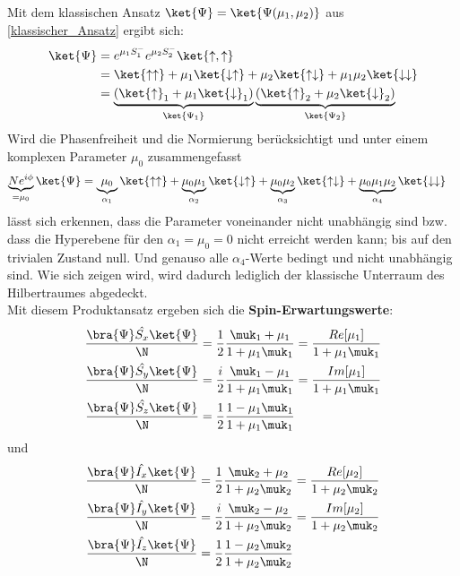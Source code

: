 \noindent Mit dem klassischen Ansatz $\ket{\Psi} = \ket{\Psi(\mu_1, \mu_2)}$ aus \autoref{klassischer_Ansatz} ergibt sich: 
\begin{align}
    \ket{\Psi} &= e^{\mu_1 S_{1}^{-}}e^{\mu_2 S_{2}^{-}}\ket{\uparrow,\uparrow}\\
                &= \ket{\uparrow \uparrow} +\mu_1\ket{\downarrow \uparrow} + \mu_2\ket{\uparrow \downarrow} + \mu_1\mu_2\ket{\downarrow\downarrow}\\
                &= \underbrace{\left(\ket{\uparrow}_1 + \mu_1\ket{\downarrow}_1\right)}_{\ket{\Psi_1}}\underbrace{\left(\ket{\uparrow}_2 + \mu_2\ket{\downarrow}_2\right)}_{\ket{\Psi_2}}  \\
\end{align}
Wird  die Phasenfreiheit und die Normierung berücksichtigt und unter einem komplexen Parameter $\mu_0$ zusammengefasst
\begin{align}\label{ueberlapp_klassisch}
    \underbrace{Ne^{i\phi}}_{=\mu_0}\ket{\Psi} &= \underbrace{\mu_0}_{\alpha_1}\ket{\uparrow \uparrow} 
    + \underbrace{\mu_0\mu_1}_{\alpha_2}\ket{\downarrow \uparrow} + \underbrace{\mu_0\mu_2}_{\alpha_3}\ket{\uparrow \downarrow} 
    + \underbrace{\mu_0\mu_1\mu_2}_{\alpha_4}\ket{\downarrow\downarrow}
\end{align}
lässt sich erkennen, dass die Parameter voneinander nicht unabhängig sind bzw. dass die Hyperebene für den $\alpha_1 = \mu_0 = 0$ nicht erreicht werden
kann; bis auf den trivialen Zustand null. Und genauso alle $\alpha_4$-Werte bedingt und nicht unabhängig sind. Wie sich zeigen wird, wird dadurch lediglich der klassische Unterraum 
des Hilbertraumes abgedeckt.\\
Mit diesem Produktansatz ergeben sich die \textbf{Spin-Erwartungswerte}:
\begin{align}
    \frac{\bra{\Psi}\hat{S_x}\ket{\Psi}}{\N} &= \frac{1}{2}\frac{\muk_1 + \mu_1}{1+\mu_1\muk_1} = \frac{Re[\mu_1]}{1 + \mu_1\muk_1} \\
    \frac{\bra{\Psi}\hat{S_y}\ket{\Psi}}{\N} &= \frac{i}{2}\frac{\muk_1 - \mu_1}{1+\mu_1\muk_1} = \frac{Im[\mu_1]}{1 + \mu_1\muk_1} \\
    \frac{\bra{\Psi}\hat{S_z}\ket{\Psi}}{\N} &= \frac{1}{2}\frac{1 - \mu_1\muk_1}{1 + \mu_1\muk_1}  
\end{align}
und 
\begin{align}
    \frac{\bra{\Psi}\hat{I_x}\ket{\Psi}}{\N} &= \frac{1}{2}\frac{\muk_2 + \mu_2}{1+\mu_2\muk_2} = \frac{Re[\mu_2]}{1 + \mu_2\muk_2} \\
    \frac{\bra{\Psi}\hat{I_y}\ket{\Psi}}{\N} &= \frac{i}{2}\frac{\muk_2 - \mu_2}{1+\mu_2\muk_2} = \frac{Im[\mu_2]}{1 + \mu_2\muk_2} \\
    \frac{\bra{\Psi}\hat{I_z}\ket{\Psi}}{\N} &= \frac{1}{2}\frac{1 - \mu_2\muk_2}{1 + \mu_2\muk_2}
\end{align}
